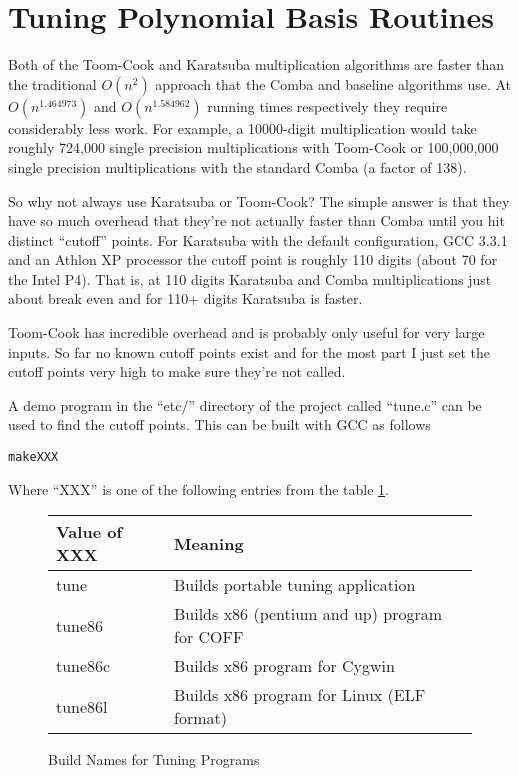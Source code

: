 \documentclass[synpaper]{book}
\begin{document}
\section{Tuning Polynomial Basis Routines}

Both of the Toom-Cook and Karatsuba multiplication algorithms are faster than the traditional $O(n^2)$ approach that
the Comba and baseline algorithms use.  At $O(n^{1.464973})$ and $O(n^{1.584962})$ running times respectively they require
considerably less work.  For example, a 10000-digit multiplication would take roughly 724,000 single precision
multiplications with Toom-Cook or 100,000,000 single precision multiplications with the standard Comba (a factor
of 138).

So why not always use Karatsuba or Toom-Cook?   The simple answer is that they have so much overhead that they're not
actually faster than Comba until you hit distinct  ``cutoff'' points.  For Karatsuba with the default configuration,
GCC 3.3.1 and an Athlon XP processor the cutoff point is roughly 110 digits (about 70 for the Intel P4).  That is, at
110 digits Karatsuba and Comba multiplications just about break even and for 110+ digits Karatsuba is faster.

Toom-Cook has incredible overhead and is probably only useful for very large inputs.  So far no known cutoff points
exist and for the most part I just set the cutoff points very high to make sure they're not called.

A demo program in the ``etc/'' directory of the project called ``tune.c'' can be used to find the cutoff points.  This
can be built with GCC as follows

\begin{alltt}
make XXX
\end{alltt}
Where ``XXX'' is one of the following entries from the table \ref{fig:tuning}.

\begin{figure}[h]
\begin{center}
\begin{small}
\begin{tabular}{|l|l|}
\hline \textbf{Value of XXX} & \textbf{Meaning} \\
\hline tune & Builds portable tuning application \\
\hline tune86 & Builds x86 (pentium and up) program for COFF \\
\hline tune86c & Builds x86 program for Cygwin \\
\hline tune86l & Builds x86 program for Linux (ELF format) \\
\hline
\end{tabular}
\end{small}
\end{center}
\caption{Build Names for Tuning Programs}
\label{fig:tuning}
\end{figure}
\end{document}

